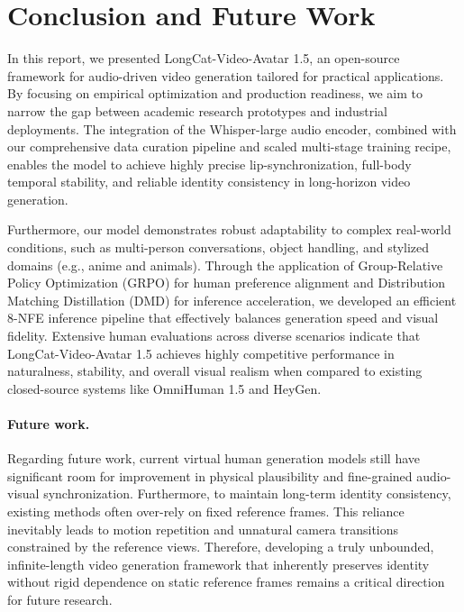 \section{Conclusion and Future Work}

In this report, we presented LongCat-Video-Avatar 1.5, an open-source framework for audio-driven video generation tailored for practical applications. By focusing on empirical optimization and production readiness, we aim to narrow the gap between academic research prototypes and industrial deployments. The integration of the Whisper-large audio encoder, combined with our comprehensive data curation pipeline and scaled multi-stage training recipe, enables the model to achieve highly precise lip-synchronization, full-body temporal stability, and reliable identity consistency in long-horizon video generation.

Furthermore, our model demonstrates robust adaptability to complex real-world conditions, such as multi-person conversations, object handling, and stylized domains (e.g., anime and animals). Through the application of Group-Relative Policy Optimization (GRPO) for human preference alignment and Distribution Matching Distillation (DMD) for inference acceleration, we developed an efficient 8-NFE inference pipeline that effectively balances generation speed and visual fidelity. Extensive human evaluations across diverse scenarios indicate that LongCat-Video-Avatar 1.5 achieves highly competitive performance in naturalness, stability, and overall visual realism when compared to existing closed-source systems like OmniHuman 1.5 and HeyGen.

\paragraph{Future work.} Regarding future work, current virtual human generation models still have significant room for improvement in physical plausibility and fine-grained audio-visual synchronization. Furthermore, to maintain long-term identity consistency, existing methods often over-rely on fixed reference frames. This reliance inevitably leads to motion repetition and unnatural camera transitions constrained by the reference views. Therefore, developing a truly unbounded, infinite-length video generation framework that inherently preserves identity without rigid dependence on static reference frames remains a critical direction for future research. 